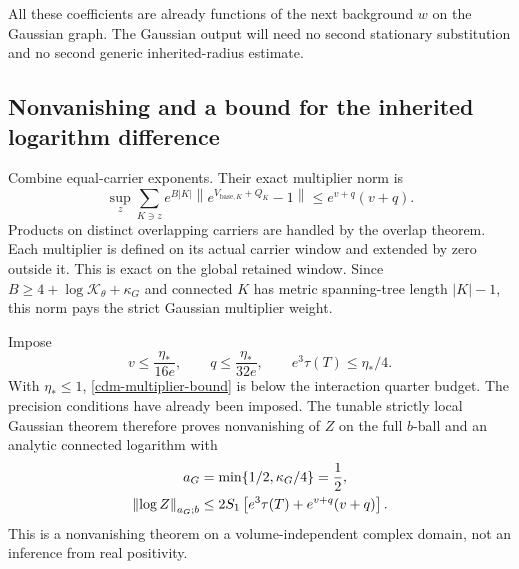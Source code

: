 \documentclass[11pt]{article}
\theoremstyle{remark}
\newcommand{\norm}[1]{\left\|#1\right\|}
\begin{document}
All these coefficients are already functions of the next
background $w$ on the Gaussian graph. The Gaussian output
will need no second stationary substitution and no second
generic inherited-radius estimate.

\subsection{Nonvanishing and a bound for the inherited logarithm difference}
\label{cdm-nonvanishing-section}

Combine equal-carrier exponents. Their exact multiplier norm is
\begin{equation}
 \sup_z\sum_{K\ni z}e^{B|K|}
       \norm{e^{V_{\mathrm{base},K}+Q_K}-1}
       \le e^{v+q}(v+q).
 \label{cdm-multiplier-bound}
\end{equation}
Products on distinct overlapping carriers are handled by the
overlap theorem. Each multiplier is defined on its actual
carrier window and extended by zero outside it. This is exact
on the global retained window. Since
$B\ge4+\log\mathcal K_\theta+\kappa_G$ and connected $K$
has metric spanning-tree length $|K|-1$, this norm pays the
strict Gaussian multiplier weight.

Impose
\begin{equation}
 v\le\frac{\eta_*}{16e},\qquad
 q\le\frac{\eta_*}{32e},\qquad e^3\tau(T)\le\eta_*/4.
 \label{cdm-quarter-budgets}
\end{equation}
With $\eta_*\le1$, \eqref{cdm-multiplier-bound} is below the
interaction quarter budget. The precision conditions have
already been imposed. The tunable strictly local Gaussian
theorem therefore proves nonvanishing of $Z$ on the full
$b$-ball and an analytic connected logarithm with
\begin{align}
 a_G&=\min\{1/2,\kappa_G/4\}=\frac12,\notag\\
 \norm{\log Z}_{a_G;b}
 &\le2S_1\left[e^3\tau(T)+e^{v+q}(v+q)\right].
 \label{cdm-log-bound}
\end{align}
This is a nonvanishing theorem on a volume-independent
complex domain, not an inference from real positivity.
\end{document}
